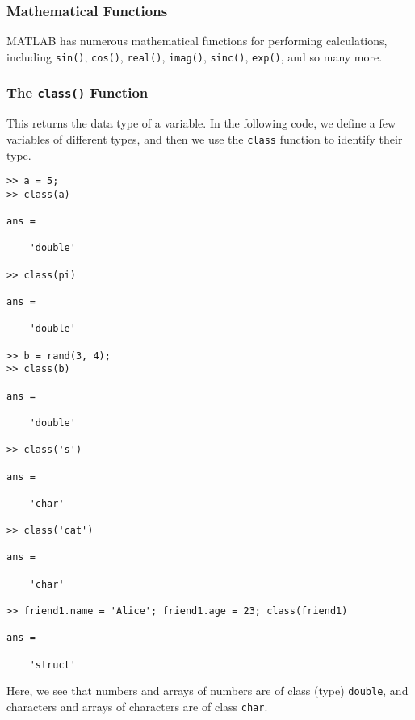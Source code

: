 \subsubsection{Mathematical Functions}
MATLAB has numerous mathematical functions for performing calculations, including \texttt{sin()}, \texttt{cos()}, \texttt{real()}, \texttt{imag()}, \texttt{sinc()}, \texttt{exp()}, and so many more.

\subsubsection{The \texttt{class()} Function}
This returns the data type of a variable. In the following code, we define a few variables of different types, and then we use the \texttt{class} function to identify their type.
\begin{lstlisting}[style=Matlab-editor]
>> a = 5;
>> class(a)

ans =

    'double'

>> class(pi)

ans =

    'double'

>> b = rand(3, 4);
>> class(b)

ans =

    'double'

>> class('s')

ans =

    'char'

>> class('cat')

ans =

    'char'
    
>> friend1.name = 'Alice'; friend1.age = 23; class(friend1)

ans =

    'struct'
\end{lstlisting}
Here, we see that numbers and arrays of numbers are of class (type) \texttt{double}, and characters and arrays of characters are of class \texttt{char}.

